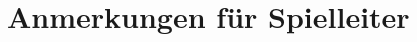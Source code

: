 \documentclass{include/pnp}
\begin{document}
	\FrontMatter

	

	\chapter*{Anmerkungen für Spielleiter}

	
	

	\MainMatter

	
	\TableOfContents

	

	\BackMatter
	
	\printglossary
\end{document}

